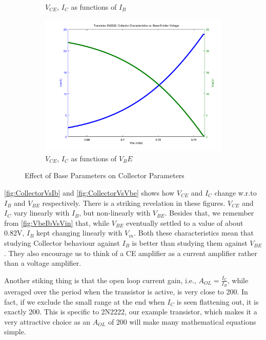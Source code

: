 \begin{figure}[h!]
{\begin{subfigure}[b]{0.75\textwidth}
			\caption{$V_{CE}$, $I_C$ as functions of $I_B$}
			\label{fig:CollectorVsIb}
		\end{subfigure}
		\begin{subfigure}[b]{0.75\textwidth}
			\centering
			\includegraphics[width = \textwidth]{partHW/NPN_2N2222_Vbe_Ic_Vce}
			\caption{$V_{CE}$, $I_C$ as functions of $V_BE$}
			\label{fig:CollectorVsVbe}
		\end{subfigure}
		}
		\caption{Effect of Base Parameters on Collector Parameters}
		\label{collage:baseVsCollector}
	\end{figure}

\autoref{fig:CollectorVsIb} and \autoref{fig:CollectorVsVbe} shows how $V_{CE}$ and $I_C$ change w.r.to $I_B$ and $V_{BE}$ respectively. There is a striking revelation in these figures. $V_{CE}$ and $I_C$ vary linearly with $I_B$, but non-linearly with $V_{BE}$. Besides that, we remember from \autoref{fig:VbeIbVsVin} that, while $V_{BE}$ eventually settled to a value of about 0.82V, $I_B$ kept changing linearly with $V_{in}$. Both these characteristics mean that studying Collector behaviour against $I_B$ is better than studying them against $V_{BE}$. They also encourage us to think of a CE amplifier as a current amplifier rather than a voltage amplifier. 

Another stiking thing is that the open loop current gain, i.e., \(A_{OL} = \frac{I_C}{I_B}\), while averaged over the period when the transistor is active, is very close to 200. In fact, if we exclude the small range at the end when $I_C$ is seen flattening out, it is exactly 200. This is specific to 2N2222, our example transistor, which makes it a very attractive choice as an $A_{OL}$ of 200 will make many mathematical equations simple. 

